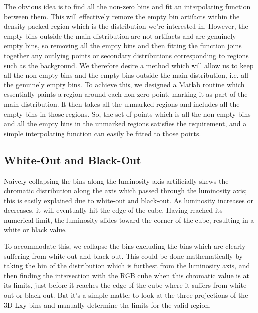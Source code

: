 The obvious idea is to find all the non-zero bins and fit an interpolating function between them. This will effectively remove the empty bin artifacts within the density-packed region which is the distribution we're interested in. However, the empty bins outside the main distribution are not artifacts and are genuinely empty bins, so removing all the empty bins and then fitting the function joins together any outlying points or secondary distributions corresponding to regions such as the background. We therefore desire a method which will allow us to keep all the non-empty bins and the empty bins outside the main distribution, i.e. all the genuinely empty bins. To achieve this, we designed a Matlab routine which essentially paints a region around each non-zero point, marking it as part of the main distribution. It then takes all the unmarked regions and includes all the empty bins in those regions. So, the set of points which is all the non-empty bins and all the empty bins in the unmarked regions satisfies the requirement, and a simple interpolating function can easily be fitted to those points.


\subsection{White-Out and Black-Out}\label{sec:WhiteOutBlackOut}

Naively collapsing the bins along the luminosity axis artificially skews the chromatic distribution along the axis which passed through the luminosity axis; this is easily explained due to white-out and black-out. As luminosity increases or decreases, it will eventually hit the edge of the cube. Having reached its numerical limit, the luminosity slides toward the corner of the cube, resulting in a white or black value.

To accommodate this, we collapse the bins excluding the bins which are clearly suffering from white-out and black-out. This could be done mathematically by taking the bin of the distribution which is furthest from the luminosity axis, and then finding the intersection with the RGB cube when this chromatic value is at its limits, just before it reaches the edge of the cube where it suffers from white-out or black-out. But it's a simple matter to look at the three projections of the 3D Lxy bins and manually determine the limits for the valid region.


